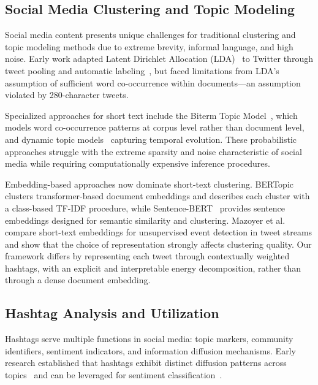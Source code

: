 \documentclass[pdflatex,sn-mathphys-num]{sn-jnl}%
\begin{document}
\subsection{Social Media Clustering and Topic Modeling}\label{subsec3}

Social media content presents unique challenges for traditional clustering and topic modeling methods due to extreme brevity, informal language, and high noise. Early work adapted Latent Dirichlet Allocation (LDA)~\cite{blei2003} to Twitter through tweet pooling and automatic labeling~\cite{mehrotra2013}, but faced limitations from LDA's assumption of sufficient word co-occurrence within documents---an assumption violated by 280-character tweets.

Specialized approaches for short text include the Biterm Topic Model~\cite{yan2013}, which models word co-occurrence patterns at corpus level rather than document level, and dynamic topic models~\cite{blei2006} capturing temporal evolution. These probabilistic approaches struggle with the extreme sparsity and noise characteristic of social media while requiring computationally expensive inference procedures.

Embedding-based approaches now dominate short-text clustering. BERTopic~\cite{grootendorst2022} clusters transformer-based document embeddings and describes each cluster with a class-based TF-IDF procedure, while Sentence-BERT~\cite{reimers2019} provides sentence embeddings designed for semantic similarity and clustering. Mazoyer et al.~\cite{mazoyer2024} compare short-text embeddings for unsupervised event detection in tweet streams and show that the choice of representation strongly affects clustering quality. Our framework differs by representing each tweet through contextually weighted hashtags, with an explicit and interpretable energy decomposition, rather than through a dense document embedding.

\subsection{Hashtag Analysis and Utilization}\label{subsec4}

Hashtags serve multiple functions in social media: topic markers, community identifiers, sentiment indicators, and information diffusion mechanisms. Early research established that hashtags exhibit distinct diffusion patterns across topics~\cite{yang2012} and can be leveraged for sentiment classification~\cite{wang2014}.
\end{document}
